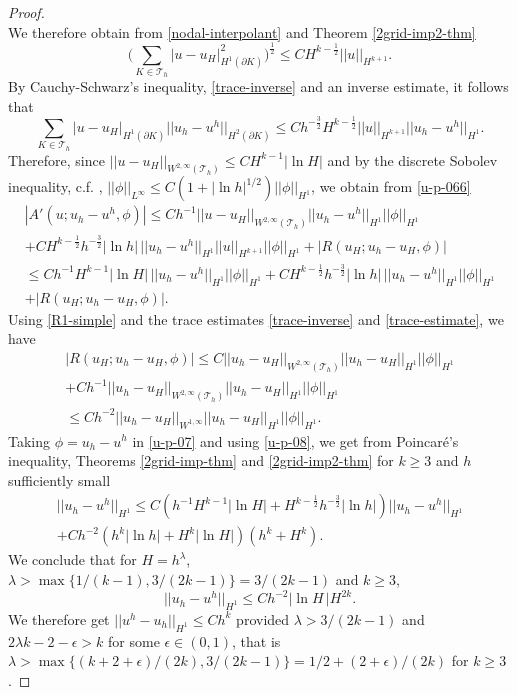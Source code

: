 \documentclass[12pt]{amsart}
\numberwithin{equation}{section}
\begin{document}
\begin{proof}
$$$$
We therefore obtain from \eqref{nodal-interpolant} and Theorem \ref{2grid-imp2-thm}
$$
\bigg( \sum_{K \in \mathcal{T}_h } | u - u_H |^2_{H^{1}(\partial K)} \bigg)^{\frac{1}{2}} \leq C H^{k-\frac{1}{2}} ||u||_{H^{k+1}}. 
$$
By Cauchy-Schwarz's inequality, \eqref{trace-inverse} and an inverse estimate, it follows that
$$
\sum_{K \in \mathcal{T}_h } | u - u_H |_{H^{1}(\partial K)} ||  u_h - u^h ||_{H^2(\partial K)} \leq C h^{- \frac{3}{2}}  H^{k-\frac{1}{2}} ||u||_{H^{k+1}}
 || u_h - u^h ||_{H^{1}}. 
$$
Therefore, since $|| u - u_H ||_{W^{2,\infty}(\mathcal{T}_h)} \leq C H^{k-1} |\ln H|$ and by the discrete Sobolev inequality, c.f.  \cite{Bramble86},
$|| \phi ||_{L^{\infty}}  \leq C (1+ | \ln h|^{ 1/2 }) ||\phi||_{H^1}$, we obtain from \eqref{u-p-066} 
\begin{multline} \label{u-p-07}
| A'(u; u_h-u^h, \phi) | \leq C h^{-1} || u - u_H ||_{W^{2,\infty}(\mathcal{T}_h)}  || u_h - u^h ||_{H^{1}} ||\phi||_{H^1} \\
+ C H^{k-\frac{1}{2}} h^{- \frac{3}{2}}   | \ln h| \, || u_h - u^h ||_{H^{1}}  ||u||_{H^{k+1} } ||\phi||_{H^1} + |R(u_H;u_h-u_H,\phi)| \\
\leq C h^{-1} H^{k-1} |\ln H| \, || u_h - u^h ||_{H^{1}} ||\phi||_{H^1} 
+ C H^{k-\frac{1}{2}} h^{- \frac{3}{2}} |\ln h| \,   || u_h - u^h ||_{H^{1}} ||\phi||_{H^1} \\
+ |R(u_H;u_h-u_H,\phi)|. 
\end{multline}
Using \eqref{R1-simple} and %
the trace estimates \eqref{trace-inverse} and \eqref{trace-estimate}, we have
\begin{multline} \label{u-p-08}
 |R(u_H;u_h-u_H,\phi)| \leq C  || u_h - u_H ||_{W^{2,\infty}(\mathcal{T}_h)}  || u_h - u_H ||_{H^{1}} ||\phi||_{H^1} \\
+ C h^{-1} || u_h - u_H ||_{W^{2,\infty}(\mathcal{T}_h)}  || u_h - u_H ||_{H^{1}} ||\phi||_{H^1}  \\
\leq C h^{-2} || u_h - u_H ||_{W^{1,\infty}}  || u_h - u_H ||_{H^{1}} ||\phi||_{H^1}. 
\end{multline}
Taking $\phi = u_h - u^h $ in \eqref{u-p-07} and using \eqref{u-p-08}, we get from Poincar\'e's inequality, Theorems \ref{2grid-imp-thm} and \ref{2grid-imp2-thm}
for $k \geq 3$ and $h$ sufficiently small
\begin{multline*}
|| u_h - u^h ||_{H^{1}} \leq C (h^{-1} H^{k-1} |\ln H| + H^{k-\frac{1}{2}} h^{- \frac{3}{2}} |\ln h|  ) || u_h - u^h ||_{H^{1}} \\
+C h^{-2} (h^{k} |\ln h | + H^{k} |\ln H |) (h^k+H^k).
\end{multline*}
We conclude that for $H=h^{\lambda}$, $\lambda > \max \{1/(k-1), 3/(2k-1) \} = 3/(2k-1)$ and $k \geq 3$, 
$$
|| u_h - u^h ||_{H^{1}} \leq C h^{-2}  |\ln H \, | H^{2k}.
$$
We therefore get $||u^h-u_h||_{H^{1}} \leq C h^k$ provided $\lambda >  3/(2k-1)$ and $2 \lambda k -2- \epsilon > k$ for some $\epsilon \in (0,1) $, that is 
$\lambda >  \max \{ (k+2+ \epsilon)/(2k), 3/(2k-1) \} = 1/2 + (2+\epsilon)/(2k)$ for $k \geq 3$. 
\end{proof}
\end{document}
